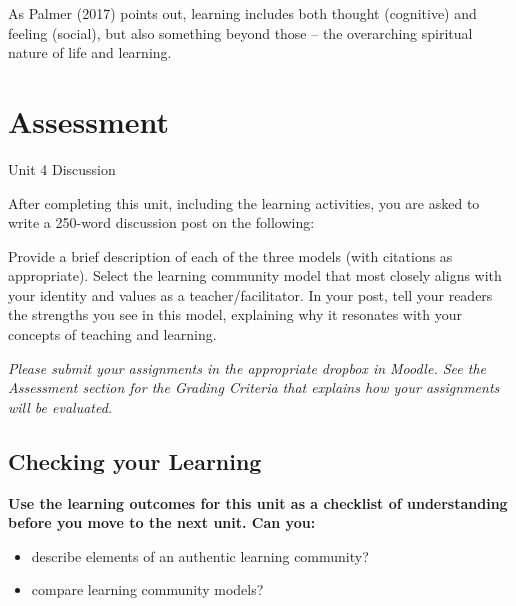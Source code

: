 \documentclass[
]{book}
\providecommand{\tightlist}{%
  \setlength{\itemsep}{0pt}\setlength{\parskip}{0pt}}
\begin{document}
As Palmer (2017) points out, learning includes both thought (cognitive) and feeling (social), but also something beyond those -- the overarching spiritual nature of life and learning.

\hypertarget{assessment-3}{%
\section*{Assessment}\label{assessment-3}}

\begin{assessment}
{Unit 4 Discussion}

After completing this unit, including the learning activities, you are asked to write a 250-word discussion post on the following:

Provide a brief description of each of the three models (with citations as appropriate). Select the learning community model that most closely aligns with your identity and values as a teacher/facilitator. In your post, tell your readers the strengths you see in this model, explaining why it resonates with your concepts of teaching and learning.
\end{assessment}

\begin{caution}
\emph{Please submit your assignments in the appropriate dropbox in Moodle. See the Assessment section for the Grading Criteria that explains how your assignments will be evaluated.}
\end{caution}

\hypertarget{checking-your-learning-3}{%
\subsection*{Checking your Learning}\label{checking-your-learning-3}}

\begin{progress}
\textbf{Use the learning outcomes for this unit as a checklist of understanding before you move to the next unit. Can you:}

\begin{itemize}
\tightlist
\item
  describe elements of an authentic learning community?\\
\item
  compare learning community models?
\end{itemize}
\end{progress}
\end{document}
